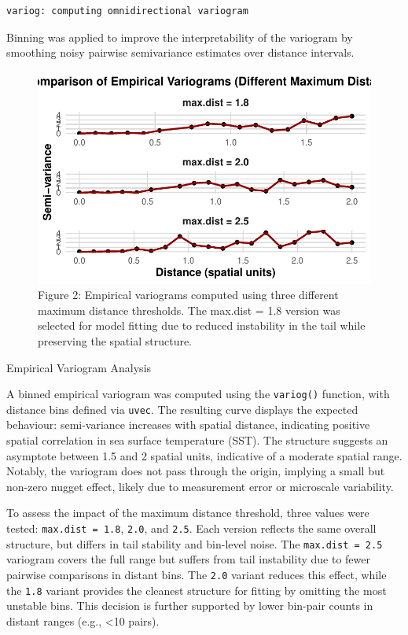 \documentclass[
  11pt,
]{article}
\begin{document}
\begin{verbatim}
variog: computing omnidirectional variogram
\end{verbatim}

Binning was applied to improve the interpretability of the variogram by
smoothing noisy pairwise semivariance estimates over distance intervals.

\begin{figure}[H]

{\centering \includegraphics{project_files/figure-pdf/fig-variogcompare-1.pdf}

}

\caption{Figure 2: Empirical variograms computed using three different
maximum distance thresholds. The max.dist = 1.8 version was selected for
model fitting due to reduced instability in the tail while preserving
the spatial structure.}

\end{figure}%

Empirical Variogram Analysis

A binned empirical variogram was computed using the \texttt{variog()}
function, with distance bins defined via \texttt{uvec}. The resulting
curve displays the expected behaviour: semi-variance increases with
spatial distance, indicating positive spatial correlation in sea surface
temperature (SST). The structure suggests an asymptote between 1.5 and 2
spatial units, indicative of a moderate spatial range. Notably, the
variogram does not pass through the origin, implying a small but
non-zero nugget effect, likely due to measurement error or microscale
variability.

To assess the impact of the maximum distance threshold, three values
were tested: \texttt{max.dist\ =\ 1.8}, \texttt{2.0}, and \texttt{2.5}.
Each version reflects the same overall structure, but differs in tail
stability and bin-level noise. The \texttt{max.dist\ =\ 2.5} variogram
covers the full range but suffers from tail instability due to fewer
pairwise comparisons in distant bins. The \texttt{2.0} variant reduces
this effect, while the \texttt{1.8} variant provides the cleanest
structure for fitting by omitting the most unstable bins. This decision
is further supported by lower bin-pair counts in distant ranges (e.g.,
\textless10 pairs).
\end{document}
